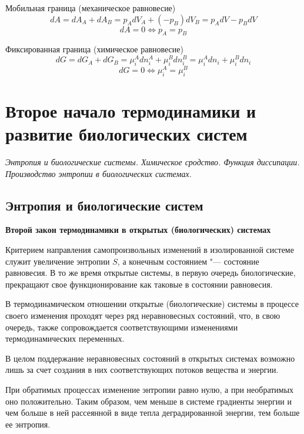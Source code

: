 \documentclass[12pt,a4paper,oneside]{book}
\begin{document}
Мобильная граница (механическое равновесие)
\begin{equation}
	dA = dA_A+dA_B=p_AdV_A+(-p_B)dV_B=p_AdV-p_BdV 
\end{equation}
\begin{equation}
	dA = 0 \Leftrightarrow p_A=p_B
\end{equation}
	
		
Фиксированная граница (химическое равновесие)
\begin{equation}
	dG = dG_A+dG_B=\mu_i^Adn_i^A+\mu_i^Bdn_i^B= \mu_i^A dn_i+\mu_i^Bdn_i
\end{equation}
\begin{equation}
	dG = 0 \Leftrightarrow \mu_i^A=\mu_i^B
\end{equation}





\newpage
\section{Второе начало термодинамики и развитие биологических систем}
{\it Энтропия и биологические системы. Химическое сродство. Функция диссипации. Производство энтропии в биологических системах.}

\subsection{Энтропия и биологические систем}

\textbf{Второй закон термодинамики в открытых (биологических) системах}

Критерием направления самопроизвольных изменений в изолированной системе служит увеличение энтропии $S$, а конечным состоянием "--- состояние равновесия. В то же время открытые системы, в первую очередь биологические, прекращают свое функционирование как таковые в состоянии равновесия.

В термодинамическом отношении открытые (биологические) системы в процессе своего изменения проходят через ряд неравновесных состояний, что, в свою очередь, также сопровождается соответствующими изменениями термодинамических переменных.

В целом поддержание неравновесных состояний в открытых системах возможно лишь за счет создания в них соответствующих потоков вещества и энергии.

При обратимых процессах изменение энтропии равно нулю, а при необратимых оно положительно. Таким образом, чем меньше в системе градиенты энергии и чем больше в ней рассеянной в виде тепла деградированной энергии, тем больше ее энтропия.
\end{document}
